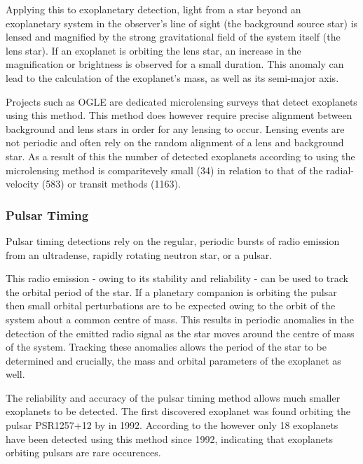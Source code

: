 \documentclass{report}
\begin{document}
Applying this to exoplanetary detection, light from a star beyond an exoplanetary system in the observer's line of sight (the background source star) is lensed and magnified by the strong gravitational field of the system itself (the lens star). If an exoplanet is orbiting the lens star, an increase in the magnification or brightness is observed for a small duration. This anomaly can lead to the calculation of the exoplanet's mass, as well as its semi-major axis.

Projects such as OGLE are dedicated microlensing surveys that detect exoplanets using this method. This method does however require precise alignment between background and lens stars in order for any lensing to occur. Lensing events are not periodic and often rely on the random alignment of a lens and background star. As a result of this the number of detected exoplanets according to \textcite{exo} using the microlensing method is comparitevely small (34) in relation to that of the radial-velocity (583) or transit methods (1163). 

\subsubsection{Pulsar Timing}
Pulsar timing detections rely on the regular, periodic bursts of radio emission from an ultradense, rapidly rotating neutron star, or a pulsar.

This radio emission - owing to its stability and reliability - can be used to track the orbital period of the star. If a planetary companion is orbiting the pulsar then small orbital perturbations are to be expected owing to the orbit of the system about a common centre of mass. This results in periodic anomalies in the detection of the emitted radio signal as the star moves around the centre of mass of the system. Tracking these anomalies allows the period of the star to be determined and crucially, the mass and orbital parameters of the exoplanet as well.

The reliability and accuracy of the pulsar timing method allows much smaller exoplanets to be detected. The first discovered exoplanet was found orbiting the pulsar PSR1257+12 by \citeauthor{first} in 1992. According to the \textcite{exo} however only 18 exoplanets have been detected using this method since 1992, indicating that exoplanets orbiting pulsars are rare occurences.

\end{document}

